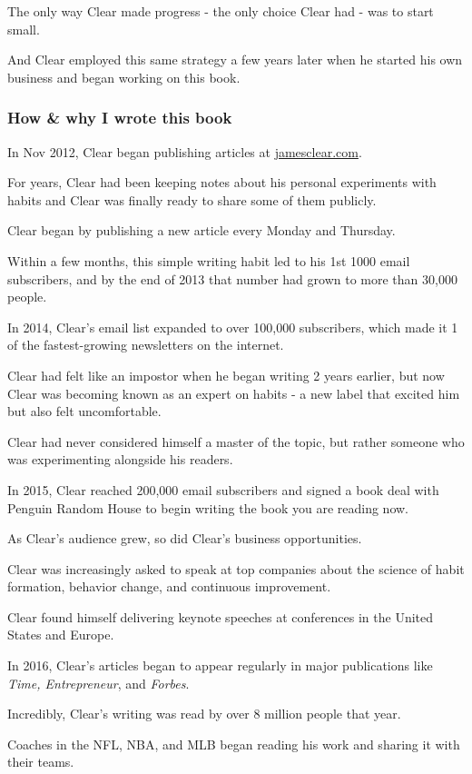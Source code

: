 \documentclass[oneside]{article}
\numberwithin{equation}{section}
\begin{document}
The only way Clear made progress - the only choice Clear had - was to start small.

And Clear employed this same strategy a few years later when he started his own business and began working on this book.

\subsubsection*{How \& why I wrote this book}
In Nov 2012, Clear began publishing articles at \url{jamesclear.com}.

For years, Clear had been keeping notes about his personal experiments with habits and Clear was finally ready to share some of them publicly.

Clear began by publishing a new article every Monday and Thursday.

Within a few months, this simple writing habit led to his 1st 1000 email subscribers, and by the end of 2013 that number had grown to more than 30,000 people.

%
In 2014, Clear's email list expanded to over 100,000 subscribers, which made it 1 of the fastest-growing newsletters on the internet.

Clear had felt like an impostor when he began writing 2 years earlier, but now Clear was becoming known as an expert on habits - a new label that excited him but also felt uncomfortable.

Clear had never considered himself a master of the topic, but rather someone who was experimenting alongside his readers.

%
In 2015, Clear reached 200,000 email subscribers and signed a book deal with Penguin Random House to begin writing the book you are reading now.

As Clear's audience grew, so did Clear's business opportunities.

Clear was increasingly asked to speak at top companies about the science of habit formation, behavior change, and continuous improvement.

Clear found himself delivering keynote speeches at conferences in the United States and Europe.

%
In 2016, Clear's articles began to appear regularly in major publications like \textit{Time, Entrepreneur}, and \textit{Forbes}.

Incredibly, Clear's writing was read by over 8 million people that year.

Coaches in the NFL, NBA, and MLB began reading his work and sharing it with their teams.
\end{document}
